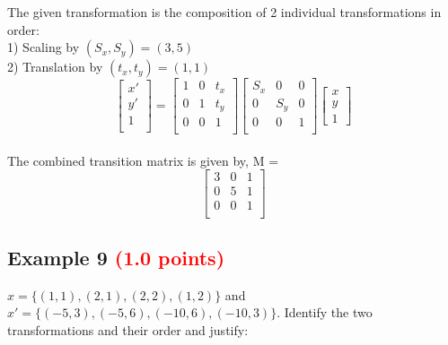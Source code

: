 \documentclass[answers]{exam}
\newcommand{\mypoints}[1]{\textcolor{red}{(#1 points)}}
\begin{document}
\begin{solution}
The given transformation is the composition of 2 individual transformations in order:\\
1) Scaling by $(S_x, S_y) = (3, 5)$\\
2) Translation by $(t_x, t_y) = (1, 1)$\\
$$
\begin{bmatrix} 
x'\\
y'\\
1\\
\end{bmatrix}
=
\begin{bmatrix}
1 & 0 & t_x\\
0 & 1 & t_y\\
0 & 0 & 1\\
\end{bmatrix}
\begin{bmatrix}
S_x & 0 & 0\\
0 & S_y & 0\\
0 & 0 & 1\\
\end{bmatrix}
\begin{bmatrix}
x\\
y\\
1
\end{bmatrix}
$$\\
The combined transition matrix is given by, M =\\
$$
\begin{bmatrix}
3 & 0 & 1\\
0 & 5 & 1\\
0 & 0 & 1\\
\end{bmatrix}$$
\end{solution}

\subsection{Example 9 \mypoints{1.0}}
$x = \{(1,1), (2,1), (2,2), (1,2)\}$ and $x' = \{(-5,3), (-5,6), (-10,6), (-10,3)\}$. Identify the two transformations and their order and justify:
\end{document}
